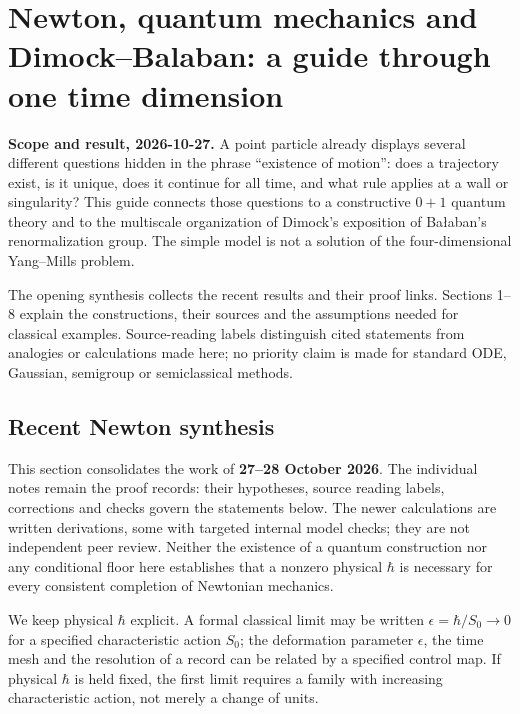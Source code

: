 \documentclass[11pt,a4paper]{article}
\begin{document}
\hypertarget{newton-quantum-mechanics-and-dimockbalaban-a-guide-through-one-time-dimension}{%
\section{Newton, quantum mechanics and Dimock--Balaban: a guide through
one time
dimension}\label{newton-quantum-mechanics-and-dimockbalaban-a-guide-through-one-time-dimension}}

\textbf{Scope and result, 2026-10-27.} A point particle already displays
several different questions hidden in the phrase ``existence of
motion'': does a trajectory exist, is it unique, does it continue for
all time, and what rule applies at a wall or singularity? This guide
connects those questions to a constructive \(0+1\) quantum theory and to
the multiscale organization of Dimock's exposition of Bałaban's
renormalization group. The simple model is not a solution of the
four-dimensional Yang--Mills problem.

The opening synthesis collects the recent results and their proof links.
Sections 1--8 explain the constructions, their sources and the
assumptions needed for classical examples. Source-reading labels
distinguish cited statements from analogies or calculations made here;
no priority claim is made for standard ODE, Gaussian, semigroup or
semiclassical methods.

\hypertarget{recent-newton-synthesis}{%
\subsection{Recent Newton synthesis}\label{recent-newton-synthesis}}

This section consolidates the work of \textbf{27--28 October 2026}. The
individual notes remain the proof records: their hypotheses, source
reading labels, corrections and checks govern the statements below. The
newer calculations are written derivations, some with targeted internal
model checks; they are not independent peer review. Neither the
existence of a quantum construction nor any conditional floor here
establishes that a nonzero physical \(\hbar\) is necessary for every
consistent completion of Newtonian mechanics.

We keep physical \(\hbar\) explicit. A formal classical limit may be
written \(\epsilon=\hbar/S_0\to0\) for a specified characteristic action
\(S_0\); the deformation parameter \(\epsilon\), the time mesh and the
resolution of a record can be related by a specified control map. If
physical \(\hbar\) is held fixed, the first limit requires a family with
increasing characteristic action, not merely a change of units.
\end{document}
